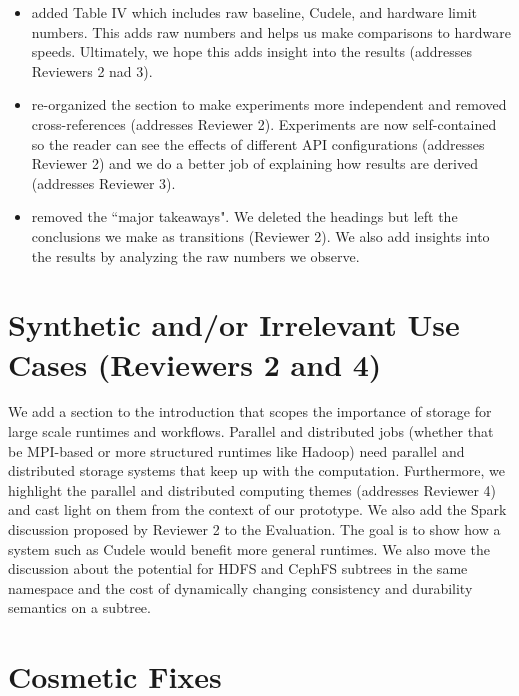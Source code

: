\documentclass[onecolumn,conference]{IEEEtran}
\begin{document}
\begin{itemize}

  \item added Table IV which includes raw baseline, Cudele, and hardware limit
numbers. This adds raw numbers and helps us make comparisons to hardware
speeds. Ultimately, we hope this adds insight into the results (addresses
Reviewers 2 nad 3).

  \item re-organized the section to make experiments more independent
and removed cross-references (addresses Reviewer 2). Experiments are now
self-contained so the reader can see the effects of different API
configurations (addresses Reviewer 2) and we do a better job of explaining how
results are derived (addresses Reviewer 3). 

  \item removed the ``major takeaways". We deleted the headings but left the
conclusions we make as transitions (Reviewer 2). We also add insights into the
results by analyzing the raw numbers we observe.

\end{itemize}

\section{Synthetic and/or Irrelevant Use Cases (Reviewers 2 and 4)}

We add a section to the introduction that scopes the importance of storage for
large scale runtimes and workflows. Parallel and distributed jobs (whether that
be MPI-based or more structured runtimes like Hadoop) need parallel and
distributed storage systems that keep up with the computation. Furthermore, we
highlight the parallel and distributed computing themes (addresses Reviewer 4)
and cast light on them from the context of our prototype. We also add the Spark
discussion proposed by Reviewer 2 to the Evaluation. The goal is to show how a
system such as Cudele would benefit more general runtimes. We also move the
discussion about the potential for HDFS and CephFS subtrees in the same
namespace and the cost of dynamically changing consistency and durability
semantics on a subtree. 

\section*{Cosmetic Fixes}



\end{document}
